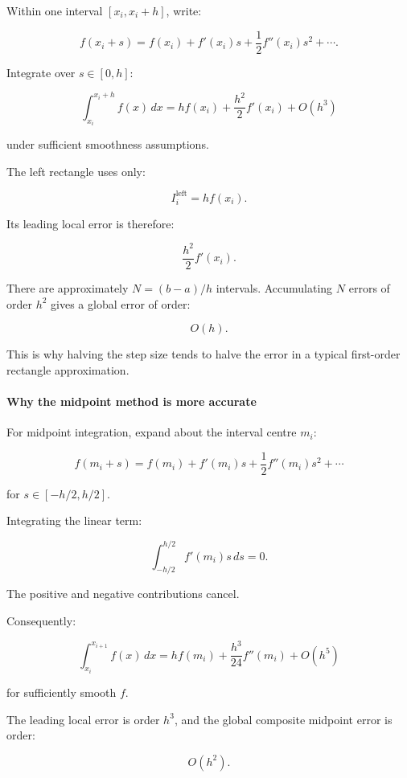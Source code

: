 \hypertarget{02-foundations-ii-ch022-deriving-the-left-rule-from-taylor-expansion}{}

Within one interval \([x_i,x_i+h]\), write:

\[
f(x_i+s)=f(x_i)+f'(x_i)s+\frac12f''(x_i)s^2+\cdots.
\]

Integrate over \(s\in[0,h]\):

\[
\int_{x_i}^{x_i+h}f(x)\,dx = hf(x_i)+\frac{h^2}{2}f'(x_i)+O(h^3)
\]

under sufficient smoothness assumptions.

The left rectangle uses only:

\[
I_i^{\mathrm{left}}=hf(x_i).
\]

Its leading local error is therefore:

\[
\frac{h^2}{2}f'(x_i).
\]

There are approximately \(N=(b-a)/h\) intervals. Accumulating \(N\) errors of order \(h^2\) gives a global error of order:

\[
\boxed{O(h)}.
\]

This is why halving the step size tends to halve the error in a typical first-order rectangle approximation.

\paragraph{Why the midpoint method is more accurate}\label{02-foundations-ii-ch022-why-the-midpoint-method-is-more-accurate}

\hypertarget{02-foundations-ii-ch022-why-the-midpoint-method-is-more-accurate}{}

For midpoint integration, expand about the interval centre \(m_i\):

\[
f(m_i+s)= f(m_i)+f'(m_i)s+\frac12f''(m_i)s^2+\cdots
\]

for \(s\in[-h/2,h/2]\).

Integrating the linear term:

\[
\int_{-h/2}^{h/2}f'(m_i)s\,ds=0.
\]

The positive and negative contributions cancel.

Consequently:

\[
\int_{x_i}^{x_{i+1}}f(x)\,dx = hf(m_i)+\frac{h^3}{24}f''(m_i)+O(h^5)
\]

for sufficiently smooth \(f\).

The leading local error is order \(h^3\), and the global composite midpoint error is order:

\[
\boxed{O(h^2)}.
\]

